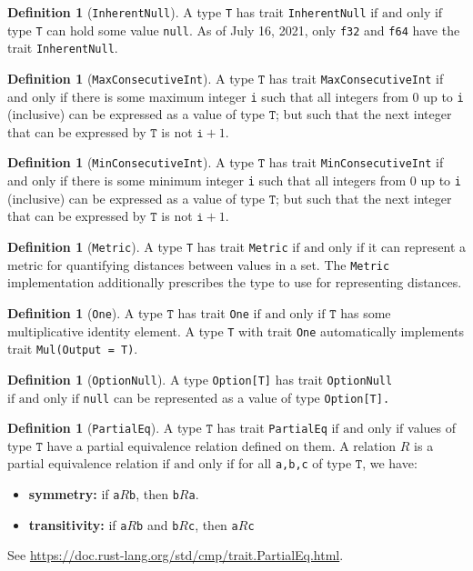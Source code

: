 \documentclass[11pt,a4paper]{article}
\theoremstyle{definition}
\newtheorem{definition}[theorem]{Definition}
\newcommand{\inRust}[2]{See \url{#2}.}
\newcommand{\T}{\texttt{T}}
\newcommand{\iffText}{\text{if and only if}}
\begin{document}
\begin{definition}[\texttt{InherentNull}]
A type \texttt{T} has trait \texttt{InherentNull} $\iffText$ type \texttt{T} can hold some value \texttt{null}.
As of July 16, 2021, only \texttt{f32} and \texttt{f64} have the trait \texttt{InherentNull}.
\end{definition}
\begin{definition}[\texttt{MaxConsecutiveInt}]
A type $\T$ has trait \texttt{MaxConsecutiveInt} if and only if there is some maximum integer \texttt{i} such that all integers from 0 up to \texttt{i} (inclusive) can be expressed as a value of type $\T$; but such that the next integer that can be expressed by $\T$ is not $\texttt{i}+1$.
\end{definition}
\begin{definition}[\texttt{MinConsecutiveInt}]
A type $\T$ has trait \texttt{MinConsecutiveInt} if and only if there is some minimum integer \texttt{i} such that all integers from 0 up to \texttt{i} (inclusive) can be expressed as a value of type $\T$; but such that the next integer that can be expressed by $\T$ is not $\texttt{i}+1$.
\end{definition}
\begin{definition}[\texttt{Metric}]
A type \texttt{T} has trait \texttt{Metric} $\iffText$ it can represent a metric for quantifying distances between values in a set. The \texttt{Metric} implementation additionally prescribes the type to use for representing distances.
\end{definition}
\begin{definition}[\texttt{One}]
    A type $\T$ has trait \texttt{One} $\iffText$ $\T$ has some multiplicative identity element. A type \texttt{T} with trait \texttt{One} automatically implements trait \texttt{Mul(Output = T)}.
\end{definition}
\begin{definition}[\texttt{OptionNull}]
A type \texttt{Option[T]} has trait \texttt{OptionNull} $\iffText$ \texttt{null} can be represented as a value of type \texttt{Option[T].}
\end{definition}
\begin{definition}[\texttt{PartialEq}]
    A type $\T$ has trait \texttt{PartialEq} $\iffText$ values of type $\T$ have a partial equivalence relation defined on them. A relation $R$ is a partial equivalence relation $\iffText$ for all \texttt{a,b,c} of type $\T$, we have:
    \begin{itemize}
        \item \textbf{symmetry:} if \texttt{a}$R$\texttt{b}, then \texttt{b}$R$\texttt{a}.
        \item \textbf{transitivity:} if \texttt{a}$R$\texttt{b} and \texttt{b}$R$\texttt{c}, then \texttt{a}$R$\texttt{c}
    \end{itemize}
    
    \inRust{Trait std::cmp::PartialEq}{https://doc.rust-lang.org/std/cmp/trait.PartialEq.html}
\end{definition}
\end{document}
